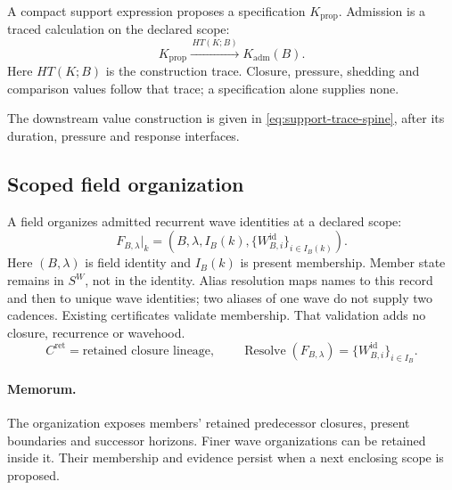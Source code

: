 A compact support expression proposes a specification \(K_{\mathrm{prop}}\).
Admission is a traced calculation on the declared scope:
\begin{equation}
K_{\mathrm{prop}}
\xrightarrow{\,HT(K;B)\,}
K_{\mathrm{adm}}(B).
\label{eq:key-proposed-admitted-trace}
\end{equation}
Here \(HT(K;B)\) is the construction trace. Closure, pressure, shedding and
comparison values follow that trace; a specification alone supplies none.

The downstream value construction is given in \eqref{eq:support-trace-spine}, after its duration, pressure and response interfaces.



\subsection{Scoped field organization}
\label{sec:field}
\label{sec:field-disposition}
\label{subsec:declared-field-choice}
A field organizes admitted recurrent wave identities at a declared scope:
\begin{equation}
F_{B,\lambda}|_k=(B,\lambda,I_B(k),
\{W^{\mathrm{id}}_{B,i}\}_{i\in I_B(k)}).
\label{eq:field-organization}
\end{equation}
Here \((B,\lambda)\) is field identity and \(I_B(k)\) is present membership.
Member state remains in \(S^W\), not in the identity. Alias resolution maps
names to this record and then to unique wave identities; two aliases of one
wave do not supply two cadences. Existing certificates validate membership.
That validation adds no closure, recurrence or wavehood.
\begin{equation}
C^{\mathrm{ret}}=\text{retained closure lineage},\qquad
\operatorname{Resolve}(F_{B,\lambda})=\{W^{\mathrm{id}}_{B,i}\}_{i\in I_B}.
\label{eq:retained-lineage-field-separation}
\end{equation}
\paragraph{Memorum.}
\label{subsec:field-memorum}
The organization exposes members' retained predecessor closures, present
boundaries and successor horizons. Finer wave organizations can be retained
inside it. Their membership and evidence persist when a next enclosing scope
is proposed.
